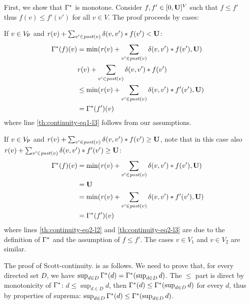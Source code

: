 \begin{myproof}
    
    First, we show that $\Gamma^*$ is monotone. Consider $f,f' \in [0,\mathbf{U}]^V$  such that
$f \leq f'$ thus $f(v) \leq f'(v')$ for all $v \in V$.  The proof proceeds by cases:

    If $v \in V_{\mathsf{P}}$ and $\mathit{r}(v) + \sum_{v' \in \mathit{post}(v)} \delta(v,v')* f(v') < \mathbf{U}$:
\begin{align}
    \Gamma^*(f)(v) & = \min (\mathit{r}(v) + \sum_{v' \in \mathit{post}(v)} \delta(v,v')* f(v'), \mathbf{U})\label{th:continuity-eq1-l1} \\
            & \mathit{r}(v) + \sum_{v' \in \mathit{post}(v)} \delta(v,v')* f(v') \label{th:continuity-eq1-l2} \\
           & \leq \min (\mathit{r}(v) + \sum_{v' \in \mathit{post}(v)} \delta(v,v') * f'(v'), \mathbf{U})          \label{th:continuity-eq1-l3} \\
           & = \Gamma^*(f')(v)  
\end{align}
    where line \ref{th:continuity-eq1-l3} follows from our assumptions.
   
    If $v \in V_{\mathsf{P}}$ and $\mathit{r}(v) + \sum_{v' \in \mathit{post}(v)} \delta(v,v')* f(v') \geq \mathbf{U}$, note that in this case
also $\mathit{r}(v) + \sum_{v' \in \mathit{post}(v)} \delta(v,v')* f'(v') \geq \mathbf{U}$:
\begin{align}
    \Gamma^*(f)(v) & = \min(\mathit{r}(v) + \sum_{v' \in \mathit{post}(v)} \delta(v,v')* f(v'), \mathbf{U}) \label{th:continuity-eq2-l1} \\
                            & = \mathbf{U}                                                                  \label{th:continuity-eq2-l2} \\
                            & = \min( \mathit{r}(v) + \sum_{v' \in \mathit{post}(v)} \delta(v,v') * f'(v'), \mathbf{U}) \label{th:continuity-eq2-l3} \\
                            & = \Gamma^*(f')(v)   \label{th:continuity-eq2-l4}
\end{align}
where lines \ref{th:continuity-eq2-l2} and  \ref{th:continuity-eq2-l3} are due to the definition of $\Gamma^*$ and the assumption of $f \leq f'$.
    The cases $v \in V_1$ and $v \in V_2$ are similar.
    
    The proof of  Scott-continuity. is as follows. We need to prove that, for every directed set $D$, we have $\sup_{d \in D} \Gamma^*(d) =  \Gamma^*(\sup_{d \in D} d)$.
    The $\leq$ part is direct by monotonicity of $\Gamma^*$: $d \leq \sup_{d \in D} d$, then $\Gamma^*(d) \leq \Gamma^*( \sup_{d \in D} d)$ for every $d$,
    thus by properties of suprema: $\sup_{d \in D} \Gamma^*(d) \leq  \Gamma^*(\sup_{d \in D} d)$.
    

\end{myproof}
